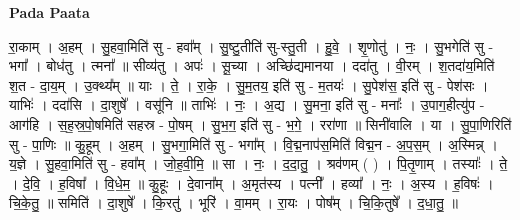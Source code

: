 \documentclass[17pt]{extarticle}
\begin{document}
\textbf{Pada Paata} \newline

रा॒काम् । अ॒हम् । सु॒हवा॒मिति॑ सु - हवा᳚म् । सु॒ष्टु॒तीति॑ सु-स्तु॒ती । हु॒वे॒ । शृ॒णोतु॑ । नः॒ । सु॒भगेति॑ सु - भगा᳚ । बोध॑तु । त्मना᳚ ॥ सीव्य॑तु । अपः॑ । सू॒च्या । अच्छि॑द्यमानया । ददा॑तु । वी॒रम् । श॒तदा॑य॒मिति॑ श॒त - दा॒य॒म् । उ॒क्थ्य᳚म् ॥ याः । ते॒ । रा॒के॒ । सु॒म॒तय॒ इति॑ सु - म॒तयः॑ । सु॒पेश॑स॒ इति॑ सु - पेश॑सः । याभिः॑ । ददा॑सि । दा॒शुषे᳚ । वसू॑नि ॥ ताभिः॑ । नः॒ । अ॒द्य । सु॒मना॒ इति॑ सु - मनाः᳚ । उ॒पाग॒हीत्यु॑प - आग॑हि । स॒ह॒स्र॒पो॒षमिति॑ सहस्र - पो॒षम् । सु॒भ॒ग॒ इति॑ सु - भ॒गे॒ । ररा॑णा ॥ सिनी॑वालि । या । सु॒पा॒णिरिति॑ सु - पा॒णिः ॥ कु॒हूम् । अ॒हम् । सु॒भगा॒मिति॑ सु - भगा᳚म् । वि॒द्म॒नाप॑स॒मिति॑ विद्म॒न - अ॒प॒स॒म् । अ॒स्मिन्न् । य॒ज्ञे । सु॒हवा॒मिति॑ सु - हवा᳚म् । जो॒ह॒वी॒मि॒ ॥ सा । नः॒ । द॒दा॒तु॒ । श्रव॑णम् ( ) । पि॒तृ॒णाम् । तस्याः᳚ । ते॒ । दे॒वि॒ । ह॒विषा᳚ । वि॒धे॒म॒ ॥ कु॒हूः । दे॒वाना᳚म् । अ॒मृत॑स्य । पत्नी᳚ । हव्या᳚ । नः॒ । अ॒स्य । ह॒विषः॑ । चि॒के॒तु॒ ॥ समिति॑ । दा॒शुषे᳚ । कि॒रतु॑ । भूरि॑ । वा॒मम् । रा॒यः । पोष᳚म् । चि॒कि॒तुषे᳚ । द॒धा॒तु॒ ॥  \newline
\end{document}

